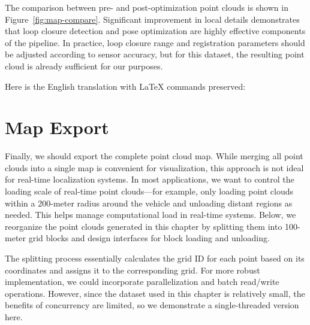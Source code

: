 The comparison between pre- and post-optimization point clouds is shown in Figure~\ref{fig:map-compare}. Significant improvement in local details demonstrates that loop closure detection and pose optimization are highly effective components of the pipeline. In practice, loop closure range and registration parameters should be adjusted according to sensor accuracy, but for this dataset, the resulting point cloud is already sufficient for our purposes.

Here is the English translation with LaTeX commands preserved:

\section{Map Export}
Finally, we should export the complete point cloud map. While merging all point clouds into a single map is convenient for visualization, this approach is not ideal for real-time localization systems. In most applications, we want to control the loading scale of real-time point clouds—for example, only loading point clouds within a 200-meter radius around the vehicle and unloading distant regions as needed. This helps manage computational load in real-time systems. Below, we reorganize the point clouds generated in this chapter by splitting them into 100-meter grid blocks and design interfaces for block loading and unloading.

The splitting process essentially calculates the grid ID for each point based on its coordinates and assigns it to the corresponding grid. For more robust implementation, we could incorporate parallelization and batch read/write operations. However, since the dataset used in this chapter is relatively small, the benefits of concurrency are limited, so we demonstrate a single-threaded version here.

